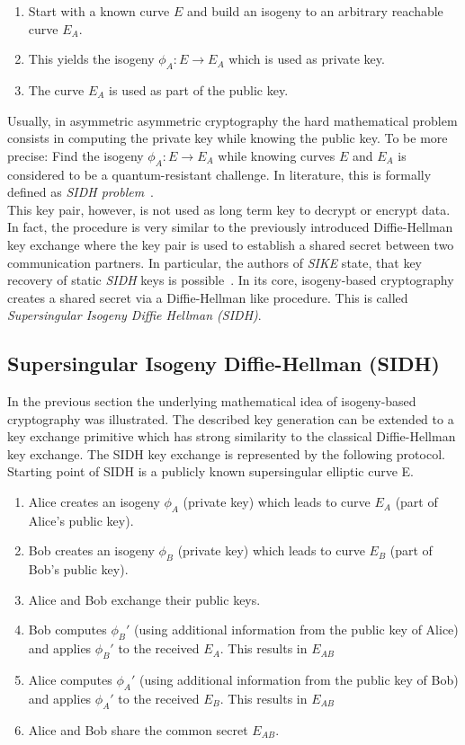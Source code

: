 \begin{enumerate}
\item Start with a known curve $E$ and build an isogeny to an arbitrary reachable curve $E_A$.
\item This yields the isogeny $\phi_A: E \to E_A$ which is used as private key.
\item The curve $E_A$ is used as part of the public key.
\end{enumerate}
Usually, in asymmetric asymmetric cryptography the hard mathematical problem consists in computing the private key while knowing the public key. To be more precise: Find the isogeny $\phi_A: E \to E_A$ while knowing curves $E$ and $E_A$ is considered to be a quantum-resistant challenge. In literature, this is formally defined as \textit{\gls{SIDH} problem}~\parencite{sike2020spec}. 
\\
This key pair, however, is not used as long term key to decrypt or encrypt data. In fact, the procedure is very similar to the previously introduced Diffie-Hellman key exchange where the key pair is used to establish a shared secret between two communication partners. In particular, the authors of \textit{\gls{SIKE}} state, that key recovery of static \textit{\gls{SIDH}} keys is possible~\parencite{sike2020spec}.
In its core, isogeny-based cryptography creates a shared secret via a Diffie-Hellman like procedure. This is called \textit{Supersingular Isogeny Diffie Hellman (\gls{SIDH})}.

\subsection{Supersingular Isogeny Diffie-Hellman (\gls{SIDH})}

In the previous section the underlying mathematical idea of isogeny-based cryptography was illustrated. The described key generation can be extended to a key exchange primitive which has strong similarity to the classical Diffie-Hellman key exchange. The SIDH key exchange is represented by the following protocol.\\
Starting point of \gls{SIDH} is a publicly known supersingular elliptic curve E. 

\begin{enumerate}
\item Alice creates an isogeny $\phi_A$ (private key) which leads to curve $E_A$ (part of Alice's public key).
\item Bob creates an isogeny $\phi_B$ (private key) which leads to curve $E_B$ (part of Bob's public key).
\item Alice and Bob exchange their public keys.
\item Bob computes $\phi_B'$ (using additional information from the public key of Alice) and applies $\phi_B'$ to the received $E_A$. This results in $E_{AB}$
\item Alice computes $\phi_A'$ (using additional information from the public key of Bob) and applies $\phi_A'$ to the received $E_B$. This results in $E_{AB}$
\item Alice and Bob share the  common secret $E_{AB}$.
\end{enumerate}


